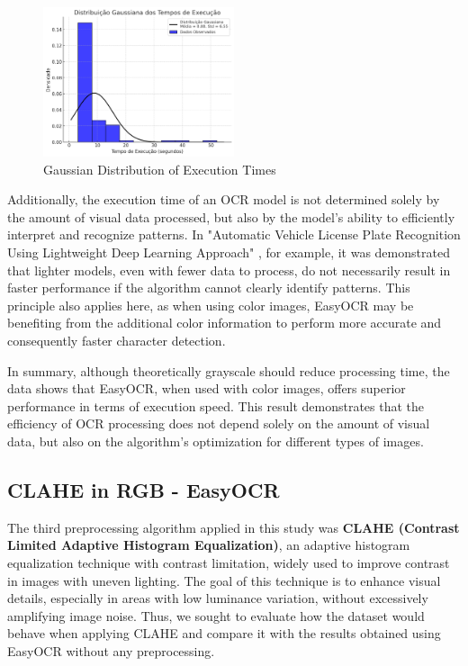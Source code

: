 \documentclass[conference]{IEEEtran}
\begin{document}
    \begin{figure}[htbp]
        \centerline{\includegraphics[width=0.5\textwidth]{img9.png}}
        \caption{Gaussian Distribution of Execution Times}
        \label{img9}
    \end{figure}
    
    Additionally, the execution time of an OCR model is not determined solely by the amount of visual data processed, but also by the model's ability to efficiently interpret and recognize patterns. In "Automatic Vehicle License Plate Recognition Using Lightweight Deep Learning Approach" \cite{b5}, for example, it was demonstrated that lighter models, even with fewer data to process, do not necessarily result in faster performance if the algorithm cannot clearly identify patterns. This principle also applies here, as when using color images, EasyOCR may be benefiting from the additional color information to perform more accurate and consequently faster character detection.
    
    In summary, although theoretically grayscale should reduce processing time, the data shows that EasyOCR, when used with color images, offers superior performance in terms of execution speed. This result demonstrates that the efficiency of OCR processing does not depend solely on the amount of visual data, but also on the algorithm's optimization for different types of images.
    
    \subsection{CLAHE in RGB - EasyOCR}
    
    The third preprocessing algorithm applied in this study was \textbf{CLAHE (Contrast Limited Adaptive Histogram Equalization)}, an adaptive histogram equalization technique with contrast limitation, widely used to improve contrast in images with uneven lighting. The goal of this technique is to enhance visual details, especially in areas with low luminance variation, without excessively amplifying image noise. Thus, we sought to evaluate how the dataset would behave when applying CLAHE and compare it with the results obtained using EasyOCR without any preprocessing.
    
\end{document}
